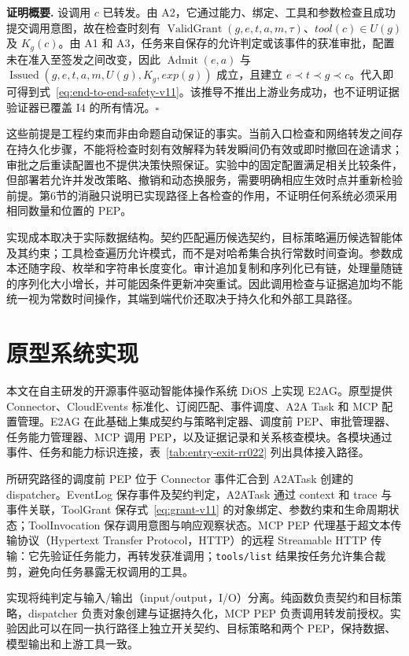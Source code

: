 \noindent\textbf{证明概要.}
设调用 $c$ 已转发。由 A2，它通过能力、绑定、工具和参数检查且成功提交调用意图，故在检查时刻有 $\operatorname{ValidGrant}(g,e,t,a,m,\tau)$、$tool(c)\in U(g)$ 及 $K_g(c)$。由 A1 和 A3，任务来自保存的允许判定或该事件的获准审批，配置未在准入至签发之间改变，因此 $\operatorname{Admit}(e,a)$ 与 $\operatorname{Issued}(g,e,t,a,m,U(g),K_g,exp(g))$ 成立，且建立 $e\prec t\prec g\prec c$。代入即可得到式~\eqref{eq:end-to-end-safety-v11}。该推导不推出上游业务成功，也不证明证据验证器已覆盖 I4 的所有情况。\hfill$\square$

这些前提是工程约束而非由命题自动保证的事实。当前入口检查和网络转发之间存在持久化步骤，不能将检查时刻有效解释为转发瞬间仍有效或即时撤回在途请求；审批之后重读配置也不提供决策快照保证。实验中的固定配置满足相关比较条件，但部署若允许并发改策略、撤销和动态换服务，需要明确相应生效时点并重新检验前提。第6节的消融只说明已实现路径上各检查的作用，不证明任何系统必须采用相同数量和位置的 PEP。

实现成本取决于实际数据结构。契约匹配遍历候选契约，目标策略遍历候选智能体及其约束；工具检查遍历允许模式，而不是对哈希集合执行常数时间查询。参数成本还随字段、枚举和字符串长度变化。审计追加复制和序列化已有链，处理量随链的序列化大小增长，并可能因条件更新冲突重试。因此调用检查与证据追加均不能统一视为常数时间操作，其端到端代价还取决于持久化和外部工具路径。

\section{原型系统实现}\label{sec:implementation-v11}

本文在自主研发的开源事件驱动智能体操作系统 DiOS 上实现 E2AG。原型提供 Connector、CloudEvents 标准化、订阅匹配、事件调度、A2A Task 和 MCP 配置管理。E2AG 在此基础上集成契约与策略判定器、调度前 PEP、审批管理器、任务能力管理器、MCP 调用 PEP，以及证据记录和关系核查模块。各模块通过事件、任务和能力标识连接，表~\ref{tab:entry-exit-rr022} 列出具体接入路径。

所研究路径的调度前 PEP 位于 Connector 事件汇合到 A2ATask 创建的 dispatcher。EventLog 保存事件及契约判定，A2ATask 通过 context 和 trace 与事件关联，ToolGrant 保存式~\eqref{eq:grant-v11} 的对象绑定、参数约束和生命周期状态；ToolInvocation 保存调用意图与响应观察状态。MCP PEP 代理基于超文本传输协议（Hypertext Transfer Protocol，HTTP）的远程 Streamable HTTP 传输：它先验证任务能力，再转发获准调用；\texttt{tools/list} 结果按任务允许集合裁剪，避免向任务暴露无权调用的工具。

实现将纯判定与输入/输出（input/output，I/O）分离。纯函数负责契约和目标策略，dispatcher 负责对象创建与证据持久化，MCP PEP 负责调用转发前授权。实验因此可以在同一执行路径上独立开关契约、目标策略和两个 PEP，保持数据、模型输出和上游工具一致。

